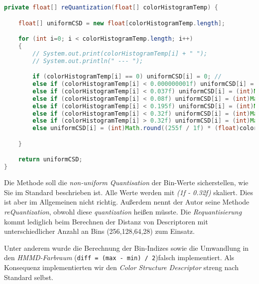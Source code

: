 \documentclass{article}
\begin{document}
    
    \begin{lstlisting}[language=Java]
private float[] reQuantization(float[] colorHistogramTemp) {

	float[] uniformCSD = new float[colorHistogramTemp.length];

	for (int i=0; i < colorHistogramTemp.length; i++)
	{
		// System.out.print(colorHistogramTemp[i] + " ");
		// System.out.println(" --- ");

		if (colorHistogramTemp[i] == 0) uniformCSD[i] = 0; //
		else if (colorHistogramTemp[i] < 0.000000001f) uniformCSD[i] = (int)Math.round( ( ((float)colorHistogramTemp[i] - 0.32f ) / ( 1f - 0.32f ) ) * 140 + (115 - 35 - 35 - 20 - 25 - 1) );	 // (int)Math.round((1f / 0.000000001f) * (float)colorHistogramTemp[i]);
		else if (colorHistogramTemp[i] < 0.037f) uniformCSD[i] = (int)Math.round( ( ((float)colorHistogramTemp[i] - 0.32f ) / ( 1f - 0.32f ) ) * 140 + (115 - 35 - 35 - 20 - 25));
		else if (colorHistogramTemp[i] < 0.08f) uniformCSD[i] = (int)Math.round( ( ((float)colorHistogramTemp[i] - 0.32f ) / ( 1f - 0.32f ) ) * 140 + (115 - 35 - 35 - 20));
		else if (colorHistogramTemp[i] < 0.195f) uniformCSD[i] = (int)Math.round( ( ((float)colorHistogramTemp[i] - 0.32f ) / ( 1f - 0.32f ) ) * 140 + (115 - 35 - 35));
		else if (colorHistogramTemp[i] < 0.32f) uniformCSD[i] = (int)Math.round( ( ((float)colorHistogramTemp[i] - 0.32f ) / ( 1f - 0.32f ) ) * 140 + (115 - 35));
		else if (colorHistogramTemp[i] > 0.32f) uniformCSD[i] = (int)Math.round( ( ((float)colorHistogramTemp[i] - 0.32f ) / ( 1f - 0.32f ) ) * 140 + 115);
		else uniformCSD[i] = (int)Math.round((255f / 1f) * (float)colorHistogramTemp[i]);

	}

	return uniformCSD;
}
	\end{lstlisting}
	Die Methode soll die \emph{non-uniform Quantisation} der Bin-Werte sicherstellen, wie Sie im Standard beschrieben ist. Alle Werte werden mit \emph{(1f - 0.32f)} skaliert. Dies ist aber im Allgemeinen nicht richtig. Außerdem nennt der Autor seine Methode \emph{reQuantization}, obwohl diese \emph{quantization} heißen müsste.
  Die \emph{Requantisierung} kommt lediglich beim Berechnen der Distanz von Descriptoren mit unterschiedlicher Anzahl an Bins (256,128,64,28) zum Einsatz.
	
	
	Unter anderem wurde die Berechnung der Bin-Indizes sowie die Umwandlung in den \emph{HMMD-Farbraum} (\mbox{\texttt{diff = (max - min) / 2}})falsch implementiert. Als Konsequenz implementierten wir den \emph{Color Structure Descriptor} streng nach Standard selbst.
	
\end{document}
